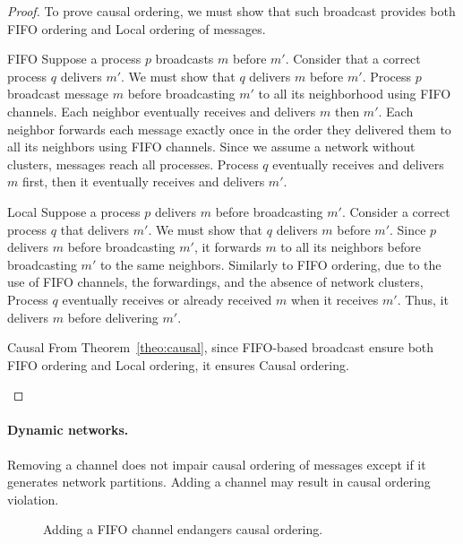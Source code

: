 \begin{proof} To prove causal ordering, we must show that such broadcast
provides both FIFO ordering and Local ordering of messages.
\begin{asparadesc}
\item [FIFO] Suppose a process $p$ broadcasts $m$ before $m'$. Consider that a
  correct process $q$ delivers $m'$. We must show that $q$ delivers $m$ before
  $m'$. Process $p$ broadcast message $m$ before broadcasting $m'$ to all its
  neighborhood using FIFO channels. Each neighbor eventually receives and
  delivers $m$ then $m'$. Each neighbor forwards each message exactly once in
  the order they delivered them to all its neighbors using FIFO channels. Since
  we assume a network without clusters, messages reach all processes. Process
  $q$ eventually receives and delivers $m$ first, then it eventually receives
  and delivers $m'$.
\item [Local] Suppose a process $p$ delivers $m$ before broadcasting
  $m'$. Consider a correct process $q$ that delivers $m'$. We must show that $q$
  delivers $m$ before $m'$. Since $p$ delivers $m$ before broadcasting $m'$, it
  forwards $m$ to all its neighbors before broadcasting $m'$ to the same
  neighbors. Similarly to FIFO ordering, due to the use of FIFO channels, the
  forwardings, and the absence of network clusters, Process $q$ eventually
  receives or already received $m$ when it receives $m'$. Thus, it delivers $m$
  before delivering $m'$.
\item [Causal] From Theorem~\ref{theo:causal}, since FIFO-based broadcast ensure
  both FIFO ordering and Local ordering, it ensures Causal ordering.
\end{asparadesc}
\end{proof}




\paragraph{Dynamic networks.} Removing a channel does not impair causal ordering
of messages except if it generates network partitions.  Adding a
channel may result in causal ordering violation. 


\begin{figure}
  \begin{center}
    
    \caption{\label{fig:problem}Adding a FIFO channel endangers causal
      ordering.}
  \end{center}
\end{figure}

